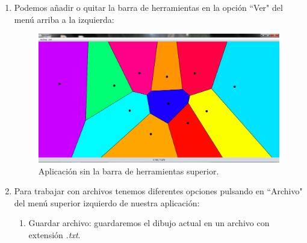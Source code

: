 \begin{enumerate}
        \item Podemos añadir o quitar la barra de herramientas en la opción ``Ver" del menú arriba a la izquierda:
        \begin{figure}[H]
            \centering
            \includegraphics[scale=0.3]{imagenes/nobarraherramientas.png}
            \caption{Aplicación sin la barra de herramientas superior.}
        \end{figure}        
        \item Para trabajar con archivos tenemos diferentes opciones pulsando en ``Archivo" del menú superior izquierdo de nuestra aplicación:
        \begin{enumerate}
            \item Guardar archivo: guardaremos el dibujo actual en un archivo con extensión \textit{.txt}.
            \begin{figure}[H]
\end{figure}
\end{enumerate}
\end{enumerate}
